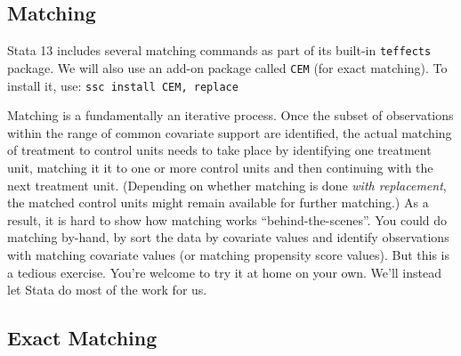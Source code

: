 \documentclass[a4paper,12pt]{article}
\begin{document}
\begin{enumerate}
\subsection*{Matching}

Stata 13 includes several matching commands as part of its built-in \texttt{teffects} package. We will also use an add-on package called \texttt{CEM} (for exact matching). To install it, use: \texttt{ssc install CEM, replace}

Matching is a fundamentally an iterative process. Once the subset of observations within the range of common covariate support are identified, the actual matching of treatment to control units needs to take place by identifying one treatment unit, matching it it to one or more control units and then continuing with the next treatment unit. (Depending on whether matching is done {\em with replacement}, the matched control units might remain available for further matching.) As a result, it is hard to show how matching works ``behind-the-scenes''. You could do matching by-hand, by sort the data by covariate values and identify observations with matching covariate values (or matching propensity score values). But this is a tedious exercise. You're welcome to try it at home on your own. We'll instead let Stata do most of the work for us.

\subsection*{Exact Matching}


\end{enumerate}
\end{document}

